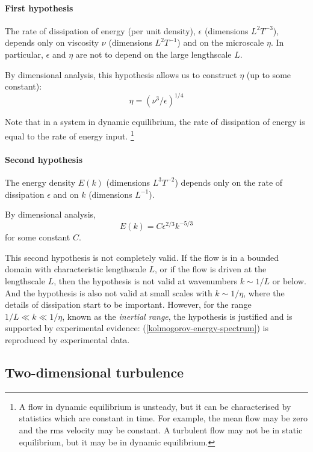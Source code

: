 \paragraph{First hypothesis} The rate of dissipation of energy (per unit density), $\epsilon$ (dimensions $L^2T^{-3}$), depends only on viscosity $\nu$ (dimensions $L^2T^{-1}$) and on the microscale $\eta$. In particular, $\epsilon$ and $\eta$ are not to depend on the large lengthscale $L$.

By dimensional analysis, this hypothesis allows us to construct $\eta$ (up to some constant):
\begin{equation}
    \eta = (\nu^3 / \epsilon)^{1/4}
\end{equation}

Note that in a system in dynamic equilibrium, the rate of dissipation of energy is equal to the rate of energy input.
\footnote{A flow in dynamic equilibrium is unsteady, but it can be characterised by statistics which are constant in time. For example, the mean flow may be zero and the rms velocity may be constant. A turbulent flow may not be in static equilibrium, but it may be in dynamic equilibrium.}

\paragraph{Second hypothesis} The energy density $E(k)$ (dimensions $L^3T^{-2}$) depends only on the rate of dissipation $\epsilon$ and on $k$ (dimensions $L^{-1}$).

By dimensional analysis,
\begin{equation}
    E(k) = C \epsilon^{2/3} k^{-5/3}
    \label{kolmogorov-energy-spectrum}
\end{equation}
for some constant $C$.

This second hypothesis is not completely valid. If the flow is in a bounded domain with characteristic lengthscale $L$, or if the flow is driven at the lengthscale $L$, then the hypothesis is not valid at wavenumbers $k\sim1/L$ or below. And the hypothesis is also not valid at small scales with $k\sim1/\eta$, where the details of dissipation start to be important. However, for the range $1/L\ll k\ll 1/\eta$, known as the \textit{inertial range}, the hypothesis is justified and is supported by experimental evidence: (\ref{kolmogorov-energy-spectrum}) is reproduced by experimental data. 

\subsection{Two-dimensional turbulence}

